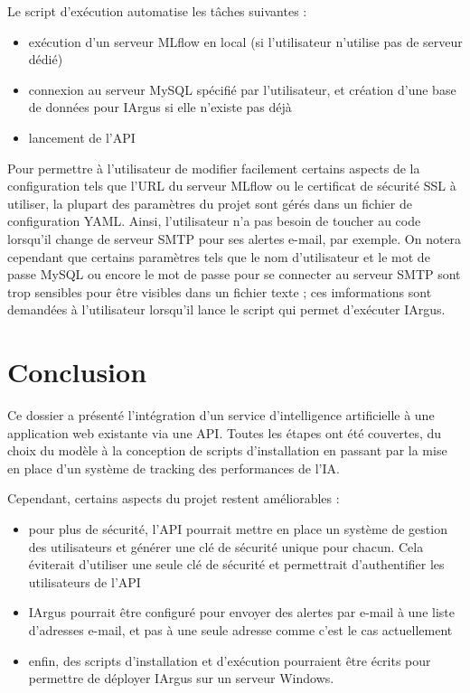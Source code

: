 \documentclass[french]{article}
\begin{document}
    Le script d'exécution automatise les tâches suivantes :
    \begin{itemize}
        \item exécution d'un serveur MLflow en local (si l'utilisateur n'utilise pas de serveur dédié)
        \item connexion au serveur MySQL spécifié par l'utilisateur, et création d'une base de données pour IArgus si elle n'existe pas déjà
        \item lancement de l'API
    \end{itemize}

    Pour permettre à l'utilisateur de modifier facilement certains aspects de la configuration tels que l'URL du serveur MLflow ou le certificat de sécurité SSL à utiliser, la plupart des paramètres du projet sont gérés dans un fichier de configuration YAML. Ainsi, l'utilisateur n'a pas besoin de toucher au code lorsqu'il change de serveur SMTP pour ses alertes e-mail, par exemple. On notera cependant que certains paramètres tels que le nom d'utilisateur et le mot de passe MySQL ou encore le mot de passe pour se connecter au serveur SMTP sont trop sensibles pour être visibles dans un fichier texte ; ces imformations sont demandées à l'utilisateur lorsqu'il lance le script qui permet d'exécuter IArgus.

    \newpage
    \section*{Conclusion}
    
    Ce dossier a présenté l'intégration d'un service d'intelligence artificielle à une application web existante via une API. Toutes les étapes ont été couvertes, du choix du modèle à la conception de scripts d'installation en passant par la mise en place d'un système de tracking des performances de l'IA.

    Cependant, certains aspects du projet restent améliorables :
    \begin{itemize}
        \item pour plus de sécurité, l'API pourrait mettre en place un système de gestion des utilisateurs et générer une clé de sécurité unique pour chacun. Cela éviterait d'utiliser une seule clé de sécurité et permettrait d'authentifier les utilisateurs de l'API
        \item IArgus pourrait être configuré pour envoyer des alertes par e-mail à une liste d'adresses e-mail, et pas à une seule adresse comme c'est le cas actuellement
        \item enfin, des scripts d'installation et d'exécution pourraient être écrits pour permettre de déployer IArgus sur un serveur Windows.
    \end{itemize}


    
\end{document}
